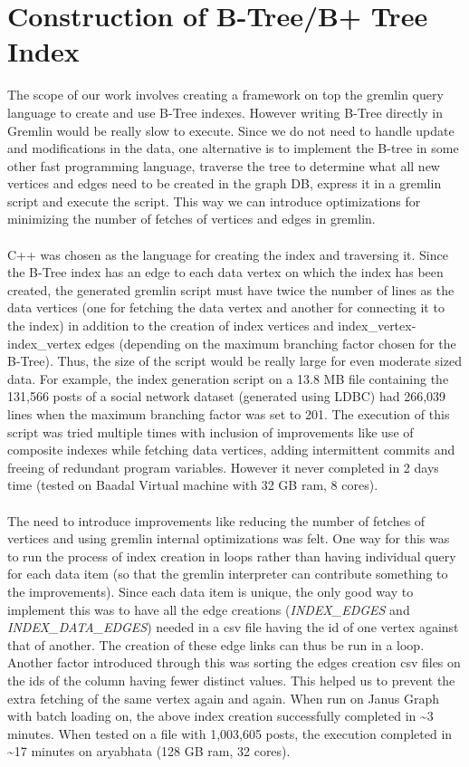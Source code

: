 \section{Construction of B-Tree/B+ Tree Index}

The scope of our work involves creating a framework on top the gremlin query language to create and use B-Tree indexes. However writing B-Tree directly in Gremlin would be really slow to execute. Since we do not need to handle update and modifications in the data, one alternative is to implement the B-tree in some other fast programming language, traverse the tree to determine what all new vertices and edges need to be created in the graph DB, express it in a gremlin script and execute the script. This way we can introduce optimizations for minimizing the number of fetches of vertices and edges in gremlin.\\\\
C++ was chosen as the language for creating the index and traversing it. Since the B-Tree index has an edge to each data vertex on which the index has been created, the generated gremlin script must have twice the number of lines as the data vertices (one for fetching the data vertex and another for connecting it to the index) in addition to the creation of index vertices and index\_vertex-index\_vertex edges (depending on the maximum branching factor chosen for the B-Tree). Thus, the size of the script would be really large for even moderate sized data. For example, the index generation script on a 13.8 MB file containing the 131,566 posts of a social network dataset (generated using LDBC) had 266,039 lines when the maximum branching factor was set to 201. The execution of this script was tried multiple times with inclusion of improvements like use of composite indexes while fetching data vertices, adding intermittent commits and freeing of redundant program variables. However it never completed in 2 days time (tested on Baadal Virtual machine with 32 GB ram, 8 cores).\\\\
The need to introduce improvements like reducing the number of fetches of vertices and using gremlin internal optimizations was felt. One way for this was to run the process of index creation in loops rather than having individual query for each data item (so that the gremlin interpreter can contribute something to the improvements). Since each data item is unique, the only good way to implement this was to have all the edge creations (\textit{INDEX\_EDGES} and \textit{INDEX\_DATA\_EDGES}) needed in a csv file having the id of one vertex against that of another. The creation of these edge links can thus be run in a loop. Another factor introduced through this was sorting the edges creation csv files on the ids of the column having fewer distinct values. This helped us to prevent the extra fetching of the same vertex again and again. When run on Janus Graph with batch loading on, the above index creation successfully completed in \textasciitilde 3 minutes. When tested on a file with 1,003,605 posts, the execution completed in \textasciitilde 17 minutes on aryabhata (128 GB ram, 32 cores).\\\\


